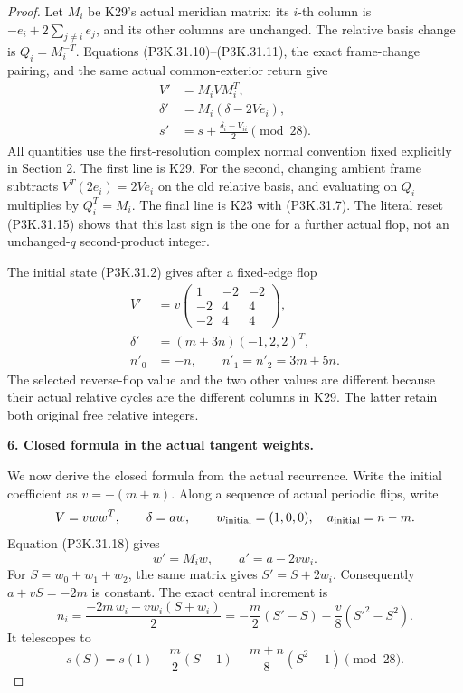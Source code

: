 \begin{proof}
Let \(M_i\) be K29's actual meridian matrix: its \(i\)-th
column is \(-e_i+2\sum_{j\ne i}e_j\), and its other
columns are unchanged. The relative basis change is
\(Q_i=M_i^{-T}\). Equations (P3K.31.10)--(P3K.31.11), the exact
frame-change pairing, and the same actual common-exterior
return give
\[
 \begin{split}
 V'&=M_iVM_i^T,\\
 \delta'&=M_i(\delta-2Ve_i),\\
 s'&=s+\frac{\delta_i-V_{ii}}2\pmod{28}.
 \end{split}                                             \tag{P3K.31.18}
\]
All quantities use the first-resolution complex normal
convention fixed explicitly in Section 2.
The first line is K29. For the second, changing ambient
frame subtracts \(V^T(2e_i)=2Ve_i\) on the old relative
basis, and evaluating on \(Q_i\) multiplies by
\(Q_i^T=M_i\). The final line is K23 with (P3K.31.7).
The literal reset (P3K.31.15) shows that this last sign is
the one for a further actual flop, not an unchanged-\(q\)
second-product integer.

The initial state (P3K.31.2) gives after a fixed-edge flop
\[
 \begin{split}
 V'&=v\begin{pmatrix}1&-2&-2\\-2&4&4\\-2&4&4\end{pmatrix},\\
 \delta'&=(m+3n)(-1,2,2)^T,\\
 n'_0&=-n,\qquad n'_1=n'_2=3m+5n .
 \end{split}                                             \tag{P3K.31.19}
\]
The selected reverse-flop value and the two other
values are different because their actual relative
cycles are the different columns in K29. The latter
retain both original free relative integers.

\par\medskip\noindent\textbf{6. Closed formula in the actual tangent weights.}\enspace

We now derive the closed formula from the actual recurrence.
Write the initial coefficient as \(v=-(m+n)\). Along a
sequence of actual periodic flips, write
\[
                  V=vww^T,\qquad \delta=a w,
 \qquad w_{\rm initial}=(1,0,0),\quad a_{\rm initial}=n-m .
\]
Equation (P3K.31.18) gives
\[
       w'=M_iw,\qquad a'=a-2v w_i.
                                                        \tag{P3K.31.20}
\]
For \(S=w_0+w_1+w_2\), the same matrix gives
\(S'=S+2w_i\). Consequently \(a+vS=-2m\) is constant.
The exact central increment is
\[
 n_i=\frac{-2m\,w_i-vw_i(S+w_i)}2
     =-\frac m2(S'-S)-\frac v8(S'^2-S^2).
                                                        \tag{P3K.31.21}
\]
It telescopes to
\[
          s(S)=s(1)-\frac m2(S-1)
                         +\frac{m+n}{8}(S^2-1)\pmod{28}.
                                                        \tag{P3K.31.22}
\]


\end{proof}
